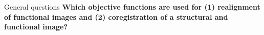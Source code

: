 \documentclass{beamer}
\begin{document}
\begin{frame}{General questions}
  \textbf{Which objective functions are used for (1) realignment of functional images and (2) coregistration of a structural and functional image? }

% 
% 
% 
\end{frame}

% 
% 
% 
% 
\end{document}
